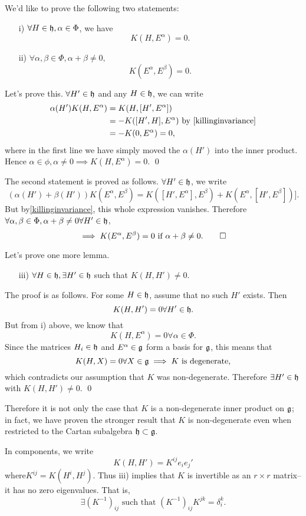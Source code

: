 We'd like to prove the following two statements:
\begin{enumerate}
    \item[i)] $\forall H\in \mathfrak{h},\alpha\in \Phi$, we have
    $$K(H,E^\alpha)=0.$$
    \item[ii)] $\forall \alpha,\beta\in \Phi, \alpha+\beta \neq 0,$
    $$K(E^\alpha,E^\beta)=0.$$
\end{enumerate}

Let's prove this. $\forall H'\in \mathfrak{h}$ and any $H\in \mathfrak{h}$, we can write
\begin{align*}
\alpha(H')K(H,E^\alpha)&= K(H,[H',E^\alpha])\\
&=-K([H',H],E^\alpha)\text{ by \ref{killinginvariance}}\\
&=-K(0,E^\alpha)=0,
\end{align*}
where in the first line we have simply moved the $\alpha(H')$ into the inner product. Hence $\alpha \in \phi, \alpha\neq 0 \implies K(H,E^\alpha)=0.$ \qed

The second statement is proved as follows. $\forall H'\in \mathfrak{h}$, we write
$$(\alpha(H')+\beta(H'))K(E^\alpha,E^\beta)=K([H',E^\alpha],E^\beta)+K(E^\alpha,[H',E^\beta])].$$
But by\ref{killinginvariance}, this whole expression vanishes. Therefore
$\forall\alpha,\beta\in \Phi, \alpha+\beta \neq 0 \forall H'\in \mathfrak{h}$,
$$\implies K(E^\alpha,E^\beta)=0 \text{ if } \alpha+\beta \neq 0. \qed$$

Let's prove one more lemma. 
\begin{itemize}
    \item[iii)] $\forall H\in \mathfrak{h}, \exists H'\in \mathfrak{h}$ such that $K(H,H')\neq 0.$
\end{itemize}
The proof is as follows. For some $H\in \mathfrak{h}$, assume that no such $H'$ exists. Then $$K(H,H')=0\forall H'\in \mathfrak{h}.$$ But from i) above, we know that
$$K(H,E^\alpha)=0\forall \alpha \in \Phi.$$
Since the matrices $H_i\in \mathfrak{h}$ and $E^\alpha\in \mathfrak{g}$ form a basis for $\mathfrak{g}$, this means that $$K(H,X)=0\forall X \in \mathfrak{g} \implies K \text{ is degenerate}, $$
which contradicts our assumption that $K$ was non-degenerate. Therefore $\exists H'\in \mathfrak{h}$ with $K(H,H')\neq 0$. \qed

Therefore it is not only the case that $K$ is a non-degenerate inner product on $\mathfrak{g}$; in fact, we have proven the stronger result that $K$ is non-degenerate even when restricted to the Cartan subalgebra $\mathfrak{h}\subset \mathfrak{g}$.

In components, we write
$$K(H,H')=K^{ij}e_i e_j'$$ where$K^{ij}=K(H^i,H^j)$. Thus iii) implies that $K$ is invertible as an $r\times r$ matrix-- it has no zero eigenvalues. That is,
$$\exists(K^{-1})_{ij}\text{ such that }(K^{-1})_{ij} K^{jk}=\delta_i^k.$$

